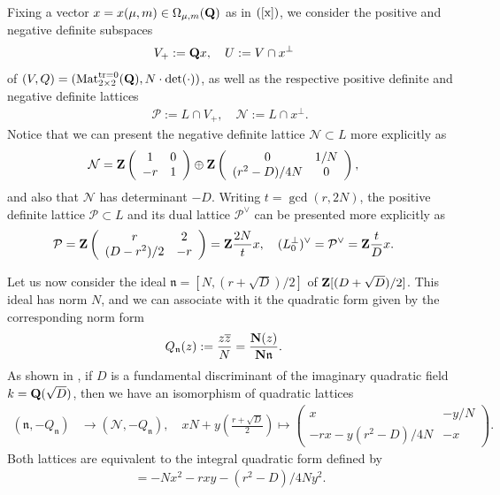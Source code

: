 \documentclass{amsart}
\theoremstyle{definition}
\theoremstyle{definition}
\theoremstyle{definition}
\begin{document}
Fixing a vector $x = x(\mu,m) \in \Omega_{\mu, m}({\bf{Q}})$ as in $(\ref{x})$, we consider the positive and negative definite subspaces 
\begin{align*} V_+ &:= {\bf{Q}} x, \quad U := V \cap x^{\perp} \end{align*}
of $(V, Q) = (\operatorname{Mat}_{2 \times 2}^{\operatorname{tr=0}}({\bf{Q}}), N \cdot \det(\cdot))$, 
as well as the respective positive definite and negative definite lattices 
\begin{align*} \mathcal{P} := L \cap V_+, \quad \mathcal{N} := L \cap x^{\perp}. \end{align*}
Notice that we can present the negative definite lattice $\mathcal{N} \subset L$ more explicitly as 
\begin{align*} \mathcal{N} 
&= {\bf{Z}} \left( \begin{array}{cc} 1 & 0 \\ -r & 1 \end{array} \right) \oplus {\bf{Z}} \left( \begin{array}{cc} 0 & 1/N \\ (r^2-D)/4N & 0 \end{array} \right), \end{align*}
and also that $\mathcal{N}$ has determinant $-D$.  Writing $t = \gcd(r, 2N)$, 
the positive definite lattice $\mathcal{P} \subset L$ and its dual lattice $\mathcal{P}^{\vee}$ can be presented more explicitly as 
\begin{align*} \mathcal{P} 
&= {\bf{Z}} \left( \begin{array}{cc} r & 2 \\ (D-r^2)/2 & -r  \end{array} \right) = {\bf{Z}} \frac{2N}{t} x, 
\quad (L_0^{\perp})^{\vee}= \mathcal{P}^{\vee} = {\bf{Z}} \frac{t}{D} x. \end{align*}

Let us now consider the ideal $\mathfrak{n} = [N, (r+\sqrt{D})/2]$ of ${\bf{Z}}[(D + \sqrt{D})/2]$.
This ideal has norm $N$, and we can associate with it the quadratic form given by the corresponding norm form
\begin{align*} Q_{\mathfrak{n}}(z) &:= \frac{z \overline{z}}{N} = \frac{ {\bf{N}}(z) }{ {\bf{N}} \mathfrak{n} }.\end{align*} 
As shown in \cite[Lemma 7.1]{BY}, if $D$ is a fundamental discriminant of the imaginary quadratic field 
$k={\bf{Q}}(\sqrt{D})$, then we have an isomorphism of quadratic lattices 
\begin{align*} (\mathfrak{n}, -Q_{\mathfrak{n}}) &\longrightarrow (\mathcal{N}, -Q_{\mathfrak{n}}), \quad xN + y \left( \frac{r + \sqrt{D}}{2} \right) 
\longmapsto \left( \begin{array}{cc} x & -y/N \\ -rx - y(r^2-D)/4N & -x \end{array} \right). \end{align*}
Both lattices are equivalent to the integral quadratic form defined by \begin{align*}[-N, -r, -(r^2-D)/4N] = -Nx^2 - rxy - (r^2-D)/4N y^2. \end{align*}
\end{document}
